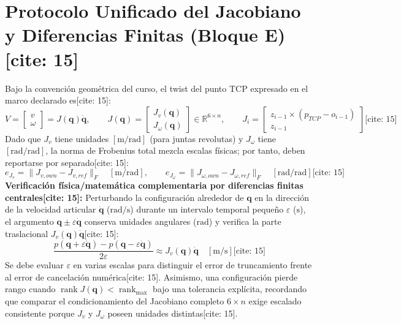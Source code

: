 \documentclass[10pt, a4paper]{article}
\begin{document}
\section{Protocolo Unificado del Jacobiano y Diferencias Finitas (Bloque E)[cite: 15]}
Bajo la convención geométrica del curso, el twist del punto TCP expresado en el marco declarado es[cite: 15]:
\begin{equation}
    V = \begin{bmatrix} v \\ \omega \end{bmatrix} = J(\mathbf{q})\dot{\mathbf{q}}, \qquad J(\mathbf{q}) = \begin{bmatrix} J_v(\mathbf{q}) \\ J_\omega(\mathbf{q}) \end{bmatrix} \in \mathbb{R}^{6 \times n}, \qquad
    J_i = \begin{bmatrix} z_{i-1} \times (p_{TCP} - o_{i-1}) \\ z_{i-1} \end{bmatrix} \text{[cite: 15]}
\end{equation}
Dado que $J_v$ tiene unidades $[\mathrm{m/rad}]$ (para juntas revolutas) y $J_\omega$ tiene $[\mathrm{rad/rad}]$, la norma de Frobenius total mezcla escalas físicas; por tanto, deben reportarse por separado[cite: 15]:
\begin{equation}
    \boxed{ e_{J_v} = \lVert J_{v,own} - J_{v,ref} \rVert_F \quad [\mathrm{m/rad}], \qquad
    e_{J_\omega} = \lVert J_{\omega,own} - J_{\omega,ref} \rVert_F \quad [\mathrm{rad/rad}] } \text{[cite: 15]}
\end{equation}
\textbf{Verificación física/matemática complementaria por diferencias finitas centrales[cite: 15]:}
Perturbando la configuración alrededor de $\mathbf{q}$ en la dirección de la velocidad articular $\dot{\mathbf{q}}$ ($\mathrm{rad/s}$) durante un intervalo temporal pequeño $\varepsilon$ ($\mathrm{s}$), el argumento $\mathbf{q} \pm \varepsilon\dot{\mathbf{q}}$ conserva unidades angulares ($\mathrm{rad}$) y verifica la parte traslacional $J_v(\mathbf{q})\dot{\mathbf{q}}$[cite: 15]:
\begin{equation}
    \boxed{ \frac{p(\mathbf{q} + \varepsilon\dot{\mathbf{q}}) - p(\mathbf{q} - \varepsilon\dot{\mathbf{q}})}{2\varepsilon} \approx J_v(\mathbf{q})\dot{\mathbf{q}} \quad [\mathrm{m/s}] } \text{[cite: 15]}
\end{equation}
Se debe evaluar $\varepsilon$ en varias escalas para distinguir el error de truncamiento frente al error de cancelación numérica[cite: 15]. Asimismo, una configuración pierde rango cuando $\operatorname{rank}J(\mathbf{q}) < \operatorname{rank}_{\max}$ bajo una tolerancia explícita, recordando que comparar el condicionamiento del Jacobiano completo $6 \times n$ exige escalado consistente porque $J_v$ y $J_\omega$ poseen unidades distintas[cite: 15].
\end{document}
